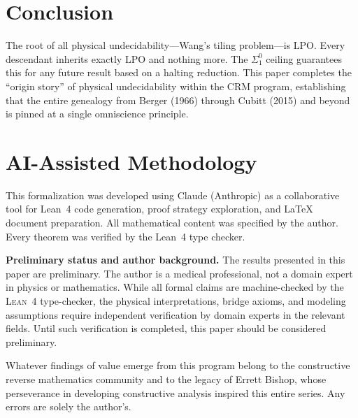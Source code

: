 \documentclass[11pt,a4paper]{article}
\theoremstyle{plain}
\theoremstyle{definition}
\newcommand{\LPO}{\ensuremath{\mathrm{LPO}}}
\newcommand{\Lean}{\textsc{Lean~4}}
\begin{document}
\section{Conclusion}\label{sec:conclusion}

The root of all physical undecidability---Wang's tiling
problem---is \LPO.  Every descendant inherits exactly \LPO{} and
nothing more.  The $\Sigma_1^0$ ceiling guarantees this for any
future result based on a halting reduction.  This paper completes
the ``origin story'' of physical undecidability within the CRM
program, establishing that the entire genealogy from Berger (1966)
through Cubitt (2015) and beyond is pinned at a single omniscience
principle.

\section{AI-Assisted Methodology}\label{sec:ai}

This formalization was developed using Claude (Anthropic) as a
collaborative tool for Lean~4 code generation, proof strategy
exploration, and \LaTeX{} document preparation.  All mathematical
content was specified by the author.  Every theorem was verified
by the Lean~4 type checker.

\medskip\noindent
\textbf{Preliminary status and author background.}
The results presented in this paper are preliminary.  The author is a medical
professional, not a domain expert in physics or mathematics.  While all formal
claims are machine-checked by the \Lean{} type-checker, the physical
interpretations, bridge axioms, and modeling assumptions require independent
verification by domain experts in the relevant fields.  Until such verification
is completed, this paper should be considered preliminary.

\medskip\noindent
Whatever findings of value emerge from this program belong to the
constructive reverse mathematics community and to the legacy of Errett Bishop,
whose perseverance in developing constructive analysis inspired this entire
series.  Any errors are solely the author's.
\end{document}
